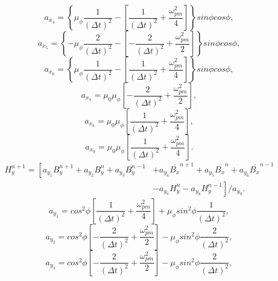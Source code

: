 \begin{equation*}
a_{x_4}=\left\lbrace\mu_{\phi}\dfrac{1}{(\Delta t)^2}-\left[\dfrac{1}{(\Delta t)^2}+\dfrac{\omega_{pm}^2}{4}\right]\right\rbrace sin\phi cos\phi,
\end{equation*}
\begin{equation*}
a_{x_5}=\left\lbrace-\mu_{\phi}\dfrac{2}{(\Delta t)^2}-\left[-\dfrac{2}{(\Delta t)^2}+\dfrac{\omega_{pm}^2}{2}\right]\right\rbrace sin\phi cos\phi,
\end{equation*}
\begin{equation*}
a_{x_6}=\left\lbrace\mu_{\phi}\dfrac{1}{(\Delta t)^2}-\left[\dfrac{1}{(\Delta t)^2}+\dfrac{\omega_{pm}^2}{4}\right]\right\rbrace sin\phi cos\phi,
\end{equation*}
\begin{equation*}
a_{x_7}=\mu_0\mu_{\phi}\left[-\dfrac{2}{(\Delta t)^2}+\dfrac{\omega_{pm}^2}{2}\right],
\end{equation*}
\begin{equation*}
a_{x_8}=\mu_0\mu_{\phi}\left[\dfrac{1}{(\Delta t)^2}+\dfrac{\omega_{pm}^2}{4}\right],
\end{equation*}
\begin{equation*}
a_{x_9}=\mu_0\mu_{\phi}\left[\dfrac{1}{(\Delta t)^2}+\dfrac{\omega_{pm}^2}{4}\right].
\end{equation*}
\begin{equation}
\begin{split}
H_y^{n+1}=\left[a_{y_1}B_y^{n+1}+a_{y_2}B_y^{n}+a_{y_3}B_y^{n-1}\right.&\left.+a_{y_4}\overline{B_x}^{n+1}+a_{y_5}\overline{B_x}^{n}+a_{y_6}\overline{B_x}^{n-1}\right.\\
&\left.-a_{y_7}H_y^{n}-a_{y_8}H_y^{n-1}\right]/a_{y_9}.
\end{split}
\label{eq:Hy-Cloak}
\end{equation}
\begin{equation*}
a_{y_1}=cos^2\phi\left[\dfrac{1}{(\Delta t)^2}+\dfrac{\omega_{pm}^2}{4}\right]+\mu_{\phi} sin^2\phi\dfrac{1}{(\Delta t)^2},
\end{equation*}
\begin{equation*}
a_{y_2}=cos^2\phi\left[-\dfrac{2}{(\Delta t)^2}+\dfrac{\omega_{pm}^2}{2}\right]-\mu_{\phi} sin^2\phi\dfrac{2}{(\Delta t)^2},
\end{equation*}
\begin{equation*}
a_{y_3}=cos^2\phi\left[-\dfrac{2}{(\Delta t)^2}+\dfrac{\omega_{pm}^2}{2}\right]-\mu_{\phi} sin^2\phi\dfrac{2}{(\Delta t)^2},
\end{equation*}
